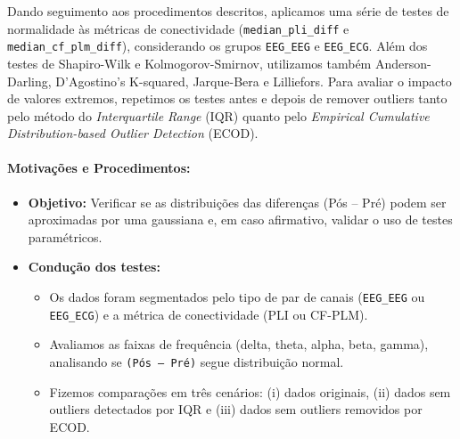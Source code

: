 Dando seguimento aos procedimentos descritos, aplicamos uma série de testes de normalidade às métricas de conectividade (\texttt{median\_pli\_diff} e \texttt{median\_cf\_plm\_diff}), considerando os grupos \texttt{EEG\_EEG} e \texttt{EEG\_ECG}. Além dos testes de Shapiro-Wilk e Kolmogorov-Smirnov, utilizamos também Anderson-Darling, D'Agostino's K-squared, Jarque-Bera e Lilliefors. Para avaliar o impacto de valores extremos, repetimos os testes antes e depois de remover outliers tanto pelo método do \emph{Interquartile Range} (IQR) quanto pelo \emph{Empirical Cumulative Distribution-based Outlier Detection} (ECOD).

\paragraph{Motivações e Procedimentos:}
\begin{itemize}
    \item \textbf{Objetivo:} Verificar se as distribuições das diferenças (Pós -- Pré) podem ser aproximadas por uma gaussiana e, em caso afirmativo, validar o uso de testes paramétricos.
    \item \textbf{Condução dos testes:} 
    \begin{itemize}
        \item Os dados foram segmentados pelo tipo de par de canais (\texttt{EEG\_EEG} ou \texttt{EEG\_ECG}) e a métrica de conectividade (PLI ou CF-PLM).
        \item Avaliamos as faixas de frequência (delta, theta, alpha, beta, gamma), analisando se \texttt{(Pós -- Pré)} segue distribuição normal.
        \item Fizemos comparações em três cenários: (i) dados originais, (ii) dados sem outliers detectados por IQR e (iii) dados sem outliers removidos por ECOD.
    \end{itemize}
\end{itemize}

